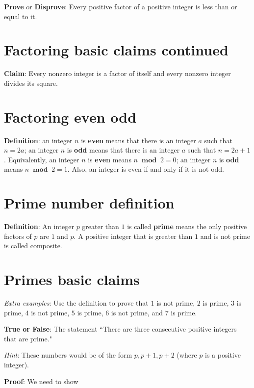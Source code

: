 \documentclass[12pt, oneside]{article}
\begin{document}
{\bf Prove} or {\bf Disprove}: Every positive factor of a positive integer is less than or equal to it.

\vfill \vfill
\section*{Factoring basic claims continued}


{\bf Claim}: Every nonzero integer is a factor of itself and 
every nonzero integer divides its square.

\vfill \vfill
\section*{Factoring even odd}


{\bf Definition}: an integer $n$ is {\bf even} means that there is an integer $a$ such that $n = 2a$; 
an integer $n$ is {\bf odd} means that there is an integer $a$ such that $n = 2a+1$.  Equivalently, 
an integer $n$ is {\bf even} means $n ~\textbf{ mod }~2 = 0$; an integer $n$ is {\bf odd} means $n ~\textbf{ mod }~2 = 1$.  
Also, an integer is even if and only if it is not odd.
 \vfill
\section*{Prime number definition}


{\bf Definition}:  An integer $p$ greater than $1$ is called {\bf prime} means 
the only positive factors of 
$p$ are $1$ and $p$. A positive integer that is greater than $1$ and is not prime 
is called composite. \vfill
\section*{Primes basic claims}


{\it Extra examples}: Use the definition to prove that $1$ is not prime, $2$ is prime, $3$
is prime, $4$ is not prime, $5$ is prime, $6$ is not prime, and $7$ is prime.


{\bf True or False}: The statement ``There are three consecutive positive integers that are prime."

{\it Hint}: These numbers would be of the form $p, p+1, p+2$ (where $p$ is a positive integer).

{\bf Proof}: We need to show \underline{}

\vspace{200pt}
\end{document}
